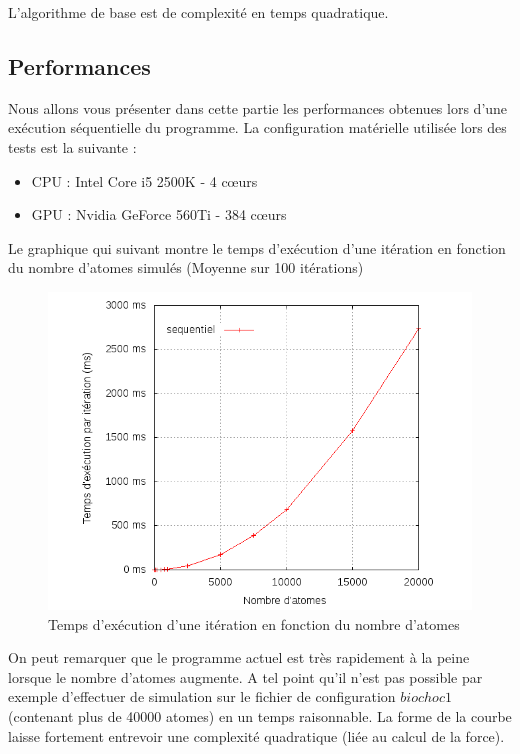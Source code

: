 L'algorithme de base est de complexité en temps quadratique.

\subsection{Performances}
Nous allons vous présenter dans cette partie les performances obtenues lors d'une exécution séquentielle du programme. 
La configuration matérielle utilisée lors des tests est la suivante :
\begin{itemize}
\item{CPU :} Intel Core i5 2500K - 4 c\oe urs
\item{GPU :} Nvidia GeForce 560Ti - 384 c\oe urs
\end{itemize} 
\vspace {0.4cm}
\par
Le graphique qui suivant montre le temps d'exécution d'une itération en fonction du nombre d'atomes simulés (Moyenne sur 100 itérations)

\begin{figure}[!h]
    \centering
    \includegraphics[scale=0.7]{./img/seq.png}
    \caption{Temps d'exécution d'une itération en fonction du nombre d'atomes}
\end{figure}

On peut remarquer que le programme actuel est très rapidement à la peine lorsque le nombre d'atomes augmente. A tel point qu'il n'est pas possible par exemple d'effectuer de simulation sur le fichier de configuration $biochoc1$ (contenant plus de 40000 atomes) en un temps raisonnable. 
La forme de la courbe laisse fortement entrevoir une complexité quadratique (liée au calcul de la force).



